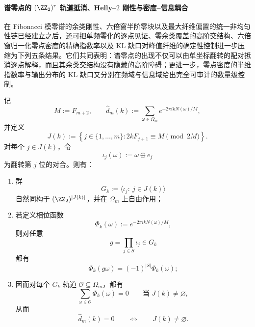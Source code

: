 \paragraph{谱零点的 \texorpdfstring{$(\ZZ_2)^r$}{(Z2)r} 轨道抵消、Helly--\texorpdfstring{$2$}{2} 刚性与密度--信息耦合}
在 Fibonacci 模零谱的余类刚性、六倍窗半阶零块以及最大纤维偏置的统一非均匀性链已经建立之后，还可把单频零化的逐点见证、零余类覆盖的高阶交结构、六倍窗归一化零点密度的精确指数率以及 KL 缺口对峰值纤维的确定性控制进一步压缩为下列五条结果。它们共同表明：谱零点的出现不仅可以由单坐标翻转的配对抵消逐点解释，而且其余类交结构没有隐藏的高阶障碍；更进一步，零点密度的半维指数率与输出分布的 KL 缺口又分别在频域与信息域给出完全可审计的数量级控制。

\begin{theorem}\label{thm:xi-time-part70c-zero-spectrum-z2-orbit-cancellation}
记
\[
M:=F_{m+2},
\qquad
\widehat d_m(k):=\sum_{\omega\in\Omega_m}e^{-2\pi i kN(\omega)/M},
\]
并定义
\[
J(k):=\left\{j\in\{1,\dots,m\}:2kF_{j+1}\equiv M\pmod{2M}\right\}.
\]
对每个 \(j\in J(k)\)，令
\[
\iota_j(\omega):=\omega\oplus e_j
\]
为翻转第 \(j\) 位的对合。则有：
\begin{enumerate}
  \item 群
  \[
  G_k:=\langle \iota_j:\ j\in J(k)\rangle
  \]
  自然同构于 \((\ZZ_2)^{|J(k)|}\)，并在 \(\Omega_m\) 上自由作用；
  \item 若定义相位函数
  \[
  \Phi_k(\omega):=e^{-2\pi i kN(\omega)/M},
  \]
  则对任意
  \[
  g=\prod_{j\in S}\iota_j\in G_k
  \]
  都有
  \[
  \Phi_k(g\omega)=(-1)^{|S|}\Phi_k(\omega);
  \]
  \item 因而对每个 \(G_k\)-轨道 \(\mathcal O\subseteq\Omega_m\)，都有
  \[
  \sum_{\omega\in\mathcal O}\Phi_k(\omega)=0
  \qquad\text{当 }J(k)\neq\varnothing,
  \]
  从而
  \[
  \widehat d_m(k)=0
  \qquad\Longleftrightarrow\qquad
  J(k)\neq\varnothing.
  \]
\end{enumerate}
\end{theorem}
